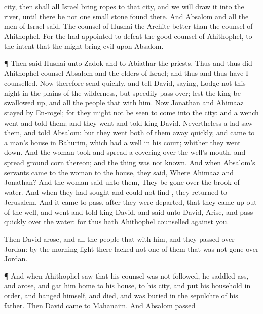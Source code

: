 {city, then shall all
Israel
bring
ropes to that
city, and we will
draw it into the
river, until there be not
one small
stone
found there.
And
Absalom and all the
men of
Israel
said, The
counsel of
Hushai the
Archite
{}
better than the
counsel of
Ahithophel. For the
{} had
appointed to
defeat the
good
counsel of
Ahithophel, to the
intent that the
{} might
bring
evil upon
Absalom.
\par }{\PP {}¶ Then
said
Hushai unto
Zadok and to
Abiathar the
priests, Thus and thus did
Ahithophel
counsel
Absalom and the
elders of
Israel; and thus and thus have I
counselled.
Now therefore
send
quickly, and
tell
David,
saying,
Lodge not this
night in the
plains of the
wilderness, but
speedily pass
over; lest the
king be swallowed
up, and all the
people that
{} with him.
Now
Jonathan and
Ahimaaz
stayed by
En-rogel; for they
might not be
seen to
come into the
city: and a
wench
went and
told them; and they
went and
told
king
David.
Nevertheless a
lad
saw them, and
told
Absalom: but they
went
both of them away
quickly, and
came to a
man’s
house in
Bahurim, which had a
well in his
court;
whither they went
down.
And the
woman
took and
spread a
covering over the
well’s
mouth, and
spread ground
corn thereon; and the
thing was not
known.
And when
Absalom’s
servants
came to the
woman to the
house, they
said, Where
{}
Ahimaaz and
Jonathan? And the
woman
said unto them, They be gone
over the
brook of
water. And when they had
sought and could not
find
{}, they
returned to
Jerusalem.
And it came to pass,
after they were
departed, that they came
up out of the
well, and
went and
told
king
David, and
said unto
David,
Arise, and pass
quickly
over the
water: for thus hath
Ahithophel
counselled against you.
\par }{\PP {}Then
David
arose, and all the
people that
{} with him, and they passed
over
Jordan: by the
morning
light there
lacked not
one of them that was not gone
over
Jordan.
\par }{\PP {}¶ And when
Ahithophel
saw that his
counsel was not
followed, he
saddled
{}
ass, and
arose, and gat him
home to his
house, to his
city, and put his
household in
order, and
hanged himself, and
died, and was
buried in the
sepulchre of his
father.
Then
David
came to
Mahanaim. And
Absalom passed
}
